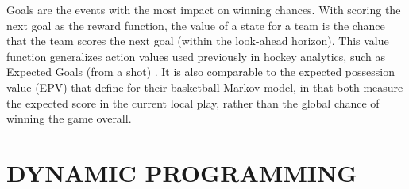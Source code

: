 Goals are the events with the most impact on winning chances. With scoring the next goal as the reward function, the  value of a state for a team is the chance that the team scores the next goal (within the look-ahead horizon). This value function generalizes action values used previously in hockey analytics, such as Expected Goals (from a shot) \citep{Tegen2015,Graphs2015}. It is also comparable to the expected possession value (EPV) that  \citep{Cervone2014a} define for their basketball Markov model, in that both measure the expected score in the current local play, rather than the global chance of winning the game overall.


 
%





\section{DYNAMIC PROGRAMMING}
\label{subsec:value-iteration-alg}

